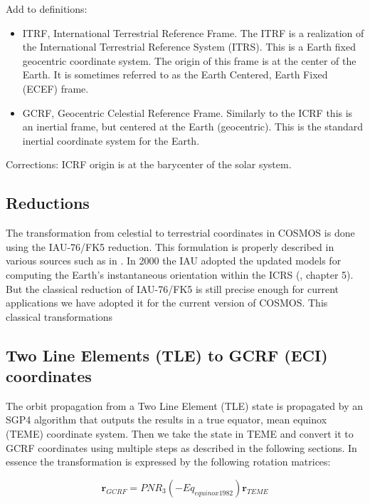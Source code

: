 \documentclass[12pt,letterpaper]{paper}
\begin{document}
Add to definitions:
\begin{itemize}
\item ITRF, International Terrestrial Reference Frame. The ITRF is a realization of the International Terrestrial Reference System (ITRS). This is a Earth fixed geocentric coordinate system. The origin of this frame is at the center of the Earth. It is sometimes referred to as the Earth Centered, Earth Fixed (ECEF) frame.
\item GCRF, Geocentric Celestial Reference Frame. Similarly to the ICRF this is an inertial frame, but centered at the Earth (geocentric). This is the standard inertial coordinate system for the Earth.
\end{itemize}

Corrections:
ICRF origin is at the barycenter of the solar system.
\subsection{Reductions}
The transformation from celestial to terrestrial coordinates in COSMOS is done using the IAU-76/FK5 reduction. This formulation is properly described in various sources such as in \cite{Vallado2013,Luzum2010,Vallado2006,Seago2000,Vallado2006a,Capitaine2003,Pottasch1997}. In 2000 the IAU adopted the updated models for computing the Earth's instantaneous orientation within the ICRS (\cite{Luzum2010}, chapter 5). But the classical reduction of IAU-76/FK5 is still precise enough for current applications we have adopted it for the current version of COSMOS. This classical transformations 

\subsection{Two Line Elements (TLE) to GCRF (ECI) coordinates}

The orbit propagation from a Two Line Element (TLE) state is propagated by an SGP4 algorithm that outputs the results in a true equator, mean equinox (TEME) coordinate system. Then we take the state in TEME and convert it to GCRF coordinates using multiple steps as described in the following sections. In essence the transformation is expressed by the following rotation matrices:

\begin{equation}
\mathbf{r}_{GCRF} = P N R_3(-Eq_{equinox1982}) \mathbf{r}_{TEME}
\end{equation}
\end{document}
